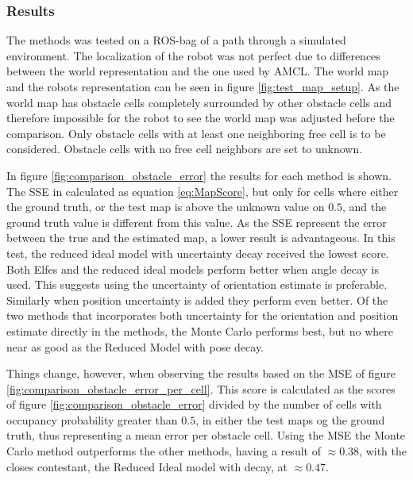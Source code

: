 \subsubsection{Results}
The methods was tested on a ROS-bag of a path through a simulated environment. 
The localization of the robot was not perfect due to differences between the world representation and the one used by AMCL.
The world map and the robots representation can be seen in figure \vref{fig:test_map_setup}.
As the world map has obstacle cells completely surrounded by other obstacle cells and therefore impossible for the robot to see the world map was adjusted before the comparison. Only obstacle cells with at least one neighboring free cell is to be considered. Obstacle cells with no free cell neighbors are set to unknown. 

In figure \vref{fig:comparison_obstacle_error} the results for each method is shown. The SSE in calculated as equation \vref{eq:MapScore}, but only for cells where either the ground truth, or the test map is above the unknown value on $0.5$, and the ground truth value is different from this value. As the SSE represent the error between the true and the estimated map, a lower result is advantageous. In this test, the reduced ideal model with uncertainty decay received the lowest score. Both Elfes and the reduced ideal models perform better when angle decay is used. This suggests using the uncertainty of orientation estimate is preferable. Similarly when position uncertainty is added they perform even better. Of the two methods that incorporates both uncertainty for the orientation and position estimate directly in the methods, the Monte Carlo performs best, but no where near as good as the Reduced Model with pose decay. 
 
Things change, however, when observing the results based on the MSE of figure \vref{fig:comparison_obstacle_error_per_cell}. 
This score is calculated as the scores of figure \vref{fig:comparison_obstacle_error} divided by the number of cells with occupancy probability greater than \(0.5\), in either the test maps og the ground truth, thus representing a mean error per obstacle cell.
Using the MSE the Monte Carlo method outperforms the other methods, having a result of \(\approx 0.38\), with the closes contestant, the Reduced Ideal model with decay, at \(\approx 0.47\).\\

